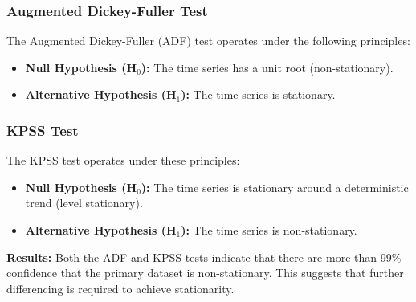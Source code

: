 \subsubsection{Augmented Dickey-Fuller Test}
The Augmented Dickey-Fuller (ADF) test operates under the following principles:
\begin{itemize}
    \item \textbf{Null Hypothesis (H\(_0\)):} The time series has a unit root (non-stationary).
    \item \textbf{Alternative Hypothesis (H\(_1\)):} The time series is stationary.
\end{itemize}


\subsubsection{KPSS Test}
The KPSS test operates under these principles:
\begin{itemize}
    \item \textbf{Null Hypothesis (H\(_0\)):} The time series is stationary around a deterministic trend (level stationary).
    \item \textbf{Alternative Hypothesis (H\(_1\)):} The time series is non-stationary.
\end{itemize}

\textbf{Results:} Both the ADF and KPSS tests indicate that there are more than 99\% confidence that the primary dataset is non-stationary.
This suggests that further differencing is required to achieve stationarity.
